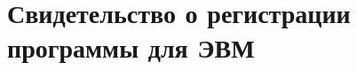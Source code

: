 \chapter{Свидетельство о регистрации программы для ЭВМ}


\begin{figure}[ht]
    \label{fig:app_program_mukhtarov}
\end{figure}










 

